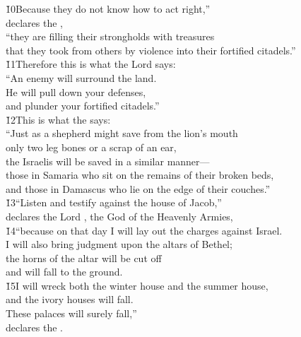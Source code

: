 \begin{poetry}
\poeml \v{10}Because they do not know how to act right,'' \\
\poemll    declares the , \\
\poeml ``they are filling their strongholds with treasures \\
\poemll    that they took from others by violence into their fortified citadels.'' \\
\poeml \v{11}Therefore this is what the Lord  says: \\
\poeml ``An enemy will surround the land. \\
\poemll    He will pull down your defenses, \\
\poemlll       and plunder your fortified citadels.'' \\
\poeml \v{12}This is what the  says: \\
\poeml ``Just as a shepherd might save from the lion's mouth \\
\poemll    only two leg bones or a scrap of an ear, \\
\poeml the Israelis will be saved in a similar manner--- \\
\poemll    those in Samaria who sit on the remains of their broken beds, \\
\poemlll       and those in Damascus who lie on the edge of their couches.'' \\
\poeml \v{13}``Listen and testify against the house of Jacob,'' \\
\poemll    declares the Lord , the God of the Heavenly Armies, \\
\poeml \v{14}``because on that day I will lay out the charges against Israel. \\
\poemll    I will also bring judgment upon the altars of Bethel; \\
\poeml the horns of the altar will be cut off \\
\poemll    and will fall to the ground. \\
\poeml \v{15}I will wreck both the winter house and the summer house, \\
\poemll    and the ivory houses will fall. \\
\poeml These palaces will surely fall,'' \\
\poemll    declares the .
\end{poetry}

